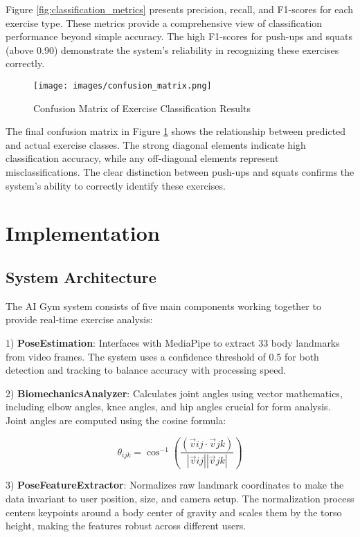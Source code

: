 \documentclass[11pt]{article}
\begin{document}
Figure \ref{fig:classification_metrics} presents precision, recall, and F1-scores for each exercise type. These metrics provide a comprehensive view of classification performance beyond simple accuracy. The high F1-scores for push-ups and squats (above 0.90) demonstrate the system's reliability in recognizing these exercises correctly.

\begin{figure}[htbp]
    \centering
    \texttt{[image: images/confusion\_matrix.png]}
    \caption{Confusion Matrix of Exercise Classification Results}
    \label{fig:confusion_matrix_final}
\end{figure}

The final confusion matrix in Figure \ref{fig:confusion_matrix_final} shows the relationship between predicted and actual exercise classes. The strong diagonal elements indicate high classification accuracy, while any off-diagonal elements represent misclassifications. The clear distinction between push-ups and squats confirms the system's ability to correctly identify these exercises.

\section{Implementation}

\subsection{System Architecture}
The AI Gym system consists of five main components working together to provide real-time exercise analysis:

1) \textbf{PoseEstimation}: Interfaces with MediaPipe to extract 33 body landmarks from video frames. The system uses a confidence threshold of 0.5 for both detection and tracking to balance accuracy with processing speed.

2) \textbf{BiomechanicsAnalyzer}: Calculates joint angles using vector mathematics, including elbow angles, knee angles, and hip angles crucial for form analysis. Joint angles are computed using the cosine formula:

\begin{equation}
\theta_{ijk} = \cos^{-1}\left(\frac{(\vec{v}{ij} \cdot \vec{v}{jk})}{|\vec{v}{ij}||\vec{v}{jk}|}\right)
\end{equation}

3) \textbf{PoseFeatureExtractor}: Normalizes raw landmark coordinates to make the data invariant to user position, size, and camera setup. The normalization process centers keypoints around a body center of gravity and scales them by the torso height, making the features robust across different users.
\end{document}
